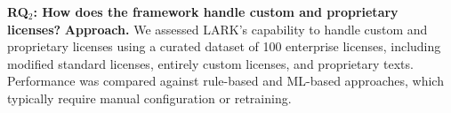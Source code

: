 \begin{comment}
\begin{boxK}
\textit{\textbf{Summary for RQ$_1$.} LARK achieves superior performance vs all 12 baselines (98.1\% accuracy, 96.2\% compatibility F1, full custom license support, high explainability, 24-hour update speed). Ablations show each component is essential: KG (structured reasoning), LLM parsing (coverage of novel licenses), RAG (explainability).}
\end{boxK}


\noindent\textbf{Ablation Analysis.} We further evaluate the contribution of each component. Removing the Knowledge Graph reduces license accuracy to 89.4\% and causes failures on 23\% of custom pairs; removing LLM parsing reduces custom coverage by 31\%; removing RAG reduces explainability from 4.8/5 to 2.1/5.

The Knowledge Graph provides structured relationship modeling across 750+ licenses and 20,000+ dependencies, enabling transitive compatibility analysis across complex dependency chains. LLM integration allows zero-shot processing of novel license texts, extracting obligations and permissions without requiring retraining. RAG enhancement retrieves relevant legal text chunks from 25,000+ indexed segments across comprehensive legal literature with 92.8\% retrieval precision, providing 3.2x more citations compared to baseline approaches.


  
\vspace{-.1cm}
\begin{boxK}
\textit{\textbf{Summary for RQ$_2$.} Each system component provides essential capabilities: Knowledge Graph enables structured reasoning (8.7\% accuracy improvement), LLM parsing provides custom license support (31\% coverage improvement), and RAG retrieval delivers critical explainability (4.8/5 vs 2.1/5 without RAG).}
\end{boxK}



\end{comment}


\textbf{RQ$_2$: How does the framework handle custom and proprietary licenses?}
\noindent\textbf{Approach.} We assessed LARK's capability to handle custom and proprietary licenses using a curated dataset of 100 enterprise licenses, including modified standard licenses, entirely custom licenses, and proprietary texts. Performance was compared against rule-based and ML-based approaches, which typically require manual configuration or retraining.


